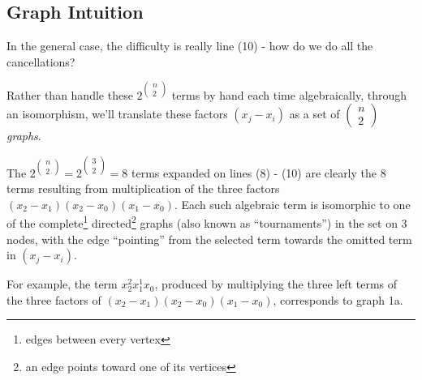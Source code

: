 \documentclass[11pt, oneside]{article} 	%
\begin{document}
\subsection{Graph Intuition}

In the general case, the difficulty is really line (10) - how do we do all the cancellations?

Rather than handle these $2^{\begin{pmatrix}n\\2\end{pmatrix}}$ terms by hand each time algebraically, through an isomorphism, we'll translate these factors $(x_j - x_i)$ as a set of $\begin{pmatrix} n\\2\end{pmatrix}$ \emph{graphs}.

The $2^{\begin{pmatrix}n\\2\end{pmatrix}} = 2^{\begin{pmatrix}3\\2\end{pmatrix}} = 8$ terms expanded on lines (8) - (10) are clearly the 8 terms resulting from multiplication of the three factors $(x_2 - x_1)(x_2-x_0)(x_1-x_0)$.  Each such algebraic term is isomorphic to one of the complete\footnote{edges between every vertex} directed\footnote{an edge points toward one of its vertices} graphs (also known as ``tournaments'') in the set on 3 nodes, with the edge ``pointing'' from the selected term towards the omitted term in $(x_j - x_i)$.

For example, the term $x_2^2x_1^1x_0$, produced by multiplying the three left terms of the three factors of $(x_2-x_1)(x_2-x_0)(x_1-x_0)$, corresponds to graph 1a.  
\end{document}
